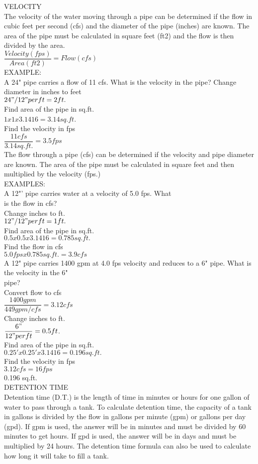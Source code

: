 \documentclass{article}
\begin{document}
VELOCITY\\
The velocity of the water moving through a pipe can be determined if the flow in cubic feet per second (cfs) and the diameter of the pipe (inches) are known. The area of the pipe must be calculated in square feet (ft2) and the flow is then divided by the area.\\
$\dfrac{Velocity (fps)}{ Area (ft2)} = Flow (cfs)$\\
EXAMPLE:\\
A 24" pipe carries a flow of 11 cfs. What is the velocity in the pipe? Change diameter in inches to feet\\
$24"/12" per ft = 2 ft.$\\
Find area of the pipe in sq.ft.\\
$1 x 1 x 3.1416 = 3.14 sq.ft$.\\
Find the velocity in fps\\
$\dfrac{11 cfs}{3.14 sq.ft.} = 3.5 fps$\\
The flow through a pipe (cfs) can be determined if the velocity and pipe diameter are known. The area of the pipe must be calculated in square feet and then multiplied by the velocity (fps.)\\
EXAMPLES:\\
A 12"’ pipe carries water at a velocity of 5.0 fps. What\\
is the flow in cfs?\\
Change inches to ft.\\
$12"/12" per ft = 1 ft.$\\
Find area of the pipe in sq.ft.\\
$0.5 x 0.5 x 3.1416 = 0.785 sq.ft.$\\
Find the flow in cfs\\
$5.0 fps x 0.785 sq.ft. = 3.9 cfs$\\
A 12" pipe carries 1400 gpm at 4.0 fps velocity and reduces to a 6" pipe. What is the velocity in the 6"\\
pipe?\\
Convert flow to cfs\\
$\dfrac{1400 gpm}{449 gpm/cfs}= 3.12 cfs$\\
Change inches to ft.\\
$\dfrac{6"}{12" per ft }= 0.5 ft$.\\
Find area of the pipe in sq.ft.\\
$0.25' x 0.25' x 3.1416 = 0.196 sq.ft.$\\
Find the velocity in fps\\
$3.12 cfs = 16 fps$\\
0.196 sq.ft.\\
DETENTION TIME\\
Detention time (D.T.) is the length of time in minutes or hours for one gallon of water to pass through a tank. To calculate detention time, the capacity of a tank in gallons is divided by the flow in gallons per minute (gpm) or gallons per day (gpd). If gpm is used, the answer will be in minutes and must be divided by 60 minutes to get hours. If gpd is used, the answer will be in days and must be multiplied by 24 hours. The detention time formula can also be used to calculate how long it will take to fill a tank.\\
\end{document}
